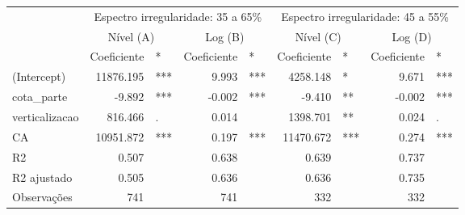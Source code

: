 \begingroup
\fontsize{10.5pt}{12.6pt}\selectfont
\begin{longtable}{lrlrlrlrl}
\toprule
 & \multicolumn{4}{c}{Espectro irregularidade: 35 a 65\%} & \multicolumn{4}{c}{Espectro irregularidade: 45 a 55\%} \\ 
\cmidrule(lr){2-5} \cmidrule(lr){6-9}
 & \multicolumn{2}{c}{Nível (A)    } & \multicolumn{2}{c}{Log (B)    } & \multicolumn{2}{c}{Nível (C)    } & \multicolumn{2}{c}{Log (D)    } \\ 
\cmidrule(lr){2-3} \cmidrule(lr){4-5} \cmidrule(lr){6-7} \cmidrule(lr){8-9}
  & Coeficiente & * & Coeficiente  & *  & Coeficiente   & *   & Coeficiente    & *    \\ 
\midrule\addlinespace[2.5pt]
(Intercept) & 11876.195 & *** & 9.993 & *** & 4258.148 & * & 9.671 & *** \\ 
cota\_parte & -9.892 & *** & -0.002 & *** & -9.410 & ** & -0.002 & *** \\ 
verticalizacao & 816.466 & . & 0.014 &  & 1398.701 & ** & 0.024 & . \\ 
CA & 10951.872 & *** & 0.197 & *** & 11470.672 & *** & 0.274 & *** \\ 
{R2} & {0.507} & {} & {0.638} & {} & {0.639} & {} & {0.737} & {} \\ 
R2 ajustado & 0.505 &  & 0.636 &  & 0.636 &  & 0.735 &  \\ 
Observações & 741 &  & 741 &  & 332 &  & 332 &  \\ 
\bottomrule
\end{longtable}
\endgroup

